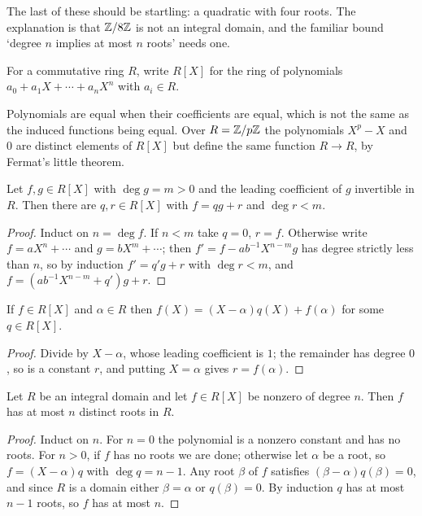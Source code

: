 \documentclass[a4paper]{scrartcl}
\begin{document}
The last of these should be startling: a quadratic with four roots. The explanation is that $\mathbb{Z}/8\mathbb{Z}$ is not an integral domain, and the familiar bound `degree $n$ implies at most $n$ roots' needs one.

\begin{definition}
	For a commutative ring $R$, write $R[X]$ for the ring of polynomials $a_0 + a_1 X + \cdots + a_n X^n$ with $a_i \in R$.
\end{definition}

\begin{remark}
	Polynomials are equal when their coefficients are equal, which is not the same as the induced functions being equal. Over $R = \mathbb{Z}/p\mathbb{Z}$ the polynomials $X^p - X$ and $0$ are distinct elements of $R[X]$ but define the same function $R \to R$, by Fermat's little theorem.
\end{remark}

\begin{proposition}
	Let $f, g \in R[X]$ with $\deg g = m > 0$ and the leading coefficient of $g$ invertible in $R$. Then there are $q, r \in R[X]$ with $f = qg + r$ and $\deg r < m$.
\end{proposition}
\begin{proof}
	Induct on $n = \deg f$. If $n < m$ take $q = 0$, $r = f$. Otherwise write $f = aX^n + \cdots$ and $g = bX^m + \cdots$; then $f' = f - ab^{-1}X^{n - m}g$ has degree strictly less than $n$, so by induction $f' = q'g + r$ with $\deg r < m$, and $f = (ab^{-1}X^{n-m} + q')g + r$.
\end{proof}

\begin{corollary}
	If $f \in R[X]$ and $\alpha \in R$ then $f(X) = (X - \alpha)q(X) + f(\alpha)$ for some $q \in R[X]$.
\end{corollary}
\begin{proof}
	Divide by $X - \alpha$, whose leading coefficient is $1$; the remainder has degree $0$, so is a constant $r$, and putting $X = \alpha$ gives $r = f(\alpha)$.
\end{proof}

\begin{theorem}\label{thm:roots}
	Let $R$ be an integral domain and let $f \in R[X]$ be nonzero of degree $n$. Then $f$ has at most $n$ distinct roots in $R$.
\end{theorem}
\begin{proof}
	Induct on $n$. For $n = 0$ the polynomial is a nonzero constant and has no roots. For $n > 0$, if $f$ has no roots we are done; otherwise let $\alpha$ be a root, so $f = (X - \alpha)q$ with $\deg q = n - 1$. Any root $\beta$ of $f$ satisfies $(\beta - \alpha)q(\beta) = 0$, and since $R$ is a domain either $\beta = \alpha$ or $q(\beta) = 0$. By induction $q$ has at most $n - 1$ roots, so $f$ has at most $n$.
\end{proof}
\end{document}
